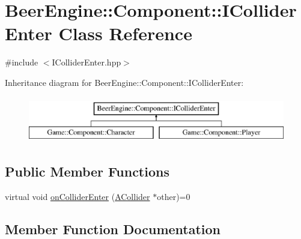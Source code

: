 \hypertarget{class_beer_engine_1_1_component_1_1_i_collider_enter}{}\section{Beer\+Engine\+:\+:Component\+:\+:I\+Collider\+Enter Class Reference}
\label{class_beer_engine_1_1_component_1_1_i_collider_enter}


{\ttfamily \#include $<$I\+Collider\+Enter.\+hpp$>$}

Inheritance diagram for Beer\+Engine\+:\+:Component\+:\+:I\+Collider\+Enter\+:\begin{figure}[H]
\begin{center}
\leavevmode
\includegraphics[height=2.000000cm]{class_beer_engine_1_1_component_1_1_i_collider_enter}
\end{center}
\end{figure}
\subsection*{Public Member Functions}
\begin{DoxyCompactItemize}
\item 
virtual void \mbox{\hyperlink{class_beer_engine_1_1_component_1_1_i_collider_enter_a2b1d3e4210b12de57f70368a8a9b6686}{on\+Collider\+Enter}} (\mbox{\hyperlink{class_beer_engine_1_1_component_1_1_a_collider}{A\+Collider}} $\ast$other)=0
\end{DoxyCompactItemize}


\subsection{Member Function Documentation}
\mbox{\label{class_beer_engine_1_1_component_1_1_i_collider_enter_a2b1d3e4210b12de57f70368a8a9b6686}} 

